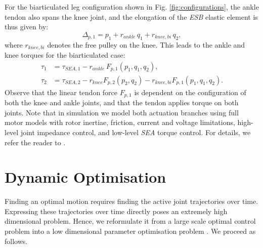 \documentclass[letterpaper, 10 pt, conference]{ieeeconf}  %
\begin{document}
For the biarticulated leg configuration shown in Fig. \ref{fig:configurations}, the ankle tendon also spans the knee joint, and the elongation of the \textit{ESB} elastic element is thus given by:
\begin{equation}
	\Delta_{p,1} = p_1 + r_{ankle} \, q_1 + r_{knee,bi} \, q_2,
	\label{eq:Delta_p_biart}
\end{equation}
where $r_{knee,bi}$ denotes the free pulley on the knee. This leads to the ankle and knee torques for the biarticulated case:
\begin{equation}
	\begin{aligned}
		\tau_1 &= \tau_{SEA,1} - r_{ankle} \, F_{p,1} \left( p_1, q_1, q_2 \right), \\
		\tau_2 &= \tau_{SEA,2} - r_{knee} F_{p,2} \left( p_2, q_2 \right) - r_{knee,bi} F_{p,1} \left( p_1, q_1, q_2 \right).
	\end{aligned}
\end{equation}
Observe that the linear tendon force $F_{p,1}$ is dependent on the configuration of both the knee and ankle joints, and that the tendon applies torque on both joints.
Note that in simulation we model both actuation branches using full motor models with rotor inertiae, friction, current and voltage limitations, high-level joint impedance control, and low-level \textit{SEA} torque control. For details, we refer the reader to \cite{roozing2016design}.


\section{Dynamic Optimisation} 
\label{sec:dynamicOptimisation}
Finding an optimal motion requires finding the active joint trajectories over time. Expressing these trajectories over time directly poses an extremely high dimensional problem. Hence, we reformulate it from a large scale optimal control problem into a low dimensional parameter optimisation problem \cite{kaphle2008optimality}. We proceed as follows. 
\end{document}
